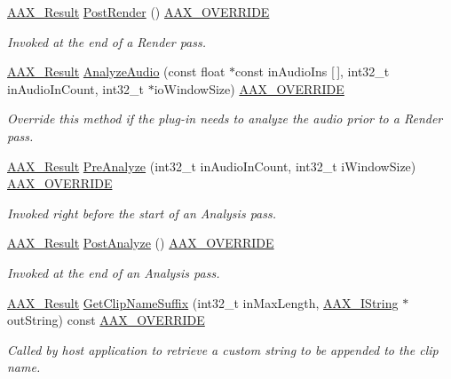 \begin{Indent}
\begin{DoxyCompactItemize}
\mbox{\hyperlink{a00392_a4d8f69a697df7f70c3a8e9b8ee130d2f}{A\+A\+X\+\_\+\+Result}} \mbox{\hyperlink{a01485_a3421c97eb8c3fb4c1287021d688b4871}{Post\+Render}} () \mbox{\hyperlink{a00392_ac2f24a5172689ae684344abdcce55463}{A\+A\+X\+\_\+\+O\+V\+E\+R\+R\+I\+DE}}
\begin{DoxyCompactList}\small\item\em Invoked at the end of a Render pass. \end{DoxyCompactList}\item 
\mbox{\hyperlink{a00392_a4d8f69a697df7f70c3a8e9b8ee130d2f}{A\+A\+X\+\_\+\+Result}} \mbox{\hyperlink{a01485_a158b4edd5d55f71037cc7c8b8f8464d0}{Analyze\+Audio}} (const float $\ast$const in\+Audio\+Ins \mbox{[}$\,$\mbox{]}, int32\+\_\+t in\+Audio\+In\+Count, int32\+\_\+t $\ast$io\+Window\+Size) \mbox{\hyperlink{a00392_ac2f24a5172689ae684344abdcce55463}{A\+A\+X\+\_\+\+O\+V\+E\+R\+R\+I\+DE}}
\begin{DoxyCompactList}\small\item\em Override this method if the plug-\/in needs to analyze the audio prior to a Render pass. \end{DoxyCompactList}\item 
\mbox{\hyperlink{a00392_a4d8f69a697df7f70c3a8e9b8ee130d2f}{A\+A\+X\+\_\+\+Result}} \mbox{\hyperlink{a01485_a2d897ab355798ae80a8974f19fb454b4}{Pre\+Analyze}} (int32\+\_\+t in\+Audio\+In\+Count, int32\+\_\+t i\+Window\+Size) \mbox{\hyperlink{a00392_ac2f24a5172689ae684344abdcce55463}{A\+A\+X\+\_\+\+O\+V\+E\+R\+R\+I\+DE}}
\begin{DoxyCompactList}\small\item\em Invoked right before the start of an Analysis pass. \end{DoxyCompactList}\item 
\mbox{\hyperlink{a00392_a4d8f69a697df7f70c3a8e9b8ee130d2f}{A\+A\+X\+\_\+\+Result}} \mbox{\hyperlink{a01485_afe000adf46a85258652a1da8e9cdf822}{Post\+Analyze}} () \mbox{\hyperlink{a00392_ac2f24a5172689ae684344abdcce55463}{A\+A\+X\+\_\+\+O\+V\+E\+R\+R\+I\+DE}}
\begin{DoxyCompactList}\small\item\em Invoked at the end of an Analysis pass. \end{DoxyCompactList}\item 
\mbox{\hyperlink{a00392_a4d8f69a697df7f70c3a8e9b8ee130d2f}{A\+A\+X\+\_\+\+Result}} \mbox{\hyperlink{a01485_a860f8ccf1035fff24513c20c206fc2c5}{Get\+Clip\+Name\+Suffix}} (int32\+\_\+t in\+Max\+Length, \mbox{\hyperlink{a01873}{A\+A\+X\+\_\+\+I\+String}} $\ast$out\+String) const \mbox{\hyperlink{a00392_ac2f24a5172689ae684344abdcce55463}{A\+A\+X\+\_\+\+O\+V\+E\+R\+R\+I\+DE}}
\begin{DoxyCompactList}\small\item\em Called by host application to retrieve a custom string to be appended to the clip name. \end{DoxyCompactList}\end{DoxyCompactItemize}
\end{Indent}
